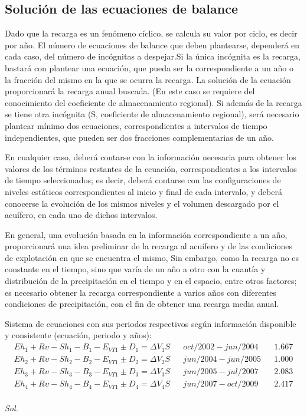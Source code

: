 \subsection{Solución de las ecuaciones de balance}
Dado que la recarga es un fenómeno cíclico, se calcula su valor por ciclo, es decir por año. El número de ecuaciones de balance que deben plantearse, dependerá en cada caso, del número de incógnitas a despejar.Si la única incógnita es la recarga, bastará con plantear una ecuación, que pueda ser la correspondiente a un año o la fracción del mismo en la que se ocurra la recarga. La solución de la ecuación proporcionará la recarga anual buscada. (En este caso se requiere del conocimiento del coeficiente de almacenamiento regional). 
Si además de la recarga se tiene otra incógnita (S, coeficiente de almacenamiento regional), será necesario plantear mínimo dos ecuaciones, correspondientes a intervalos de tiempo independientes, que pueden ser dos fracciones complementarias de un año.

En cualquier caso, deberá contarse con la información necesaria para obtener los valores de los términos restantes de la ecuación, correspondientes a los intervalos de tiempo seleccionados; es decir, deberá contarse con las configuraciones de niveles estáticos correspondientes al inicio y final de cada intervalo, y deberá conocerse la evolución de los mismos niveles y el volumen descargado por el acuífero, en cada uno de dichos intervalos.

En general, una evolución basada en la información correspondiente a un año, proporcionará una idea preliminar de la recarga al acuífero y de las condiciones de explotación en que se encuentra el mismo, Sin embargo, como la recarga no es constante en el tiempo, sino que varía de un año a otro con la cuantía y distribución de la precipitación en el tiempo y en el espacio, entre otros factores; es necesario obtener la recarga correspondiente a varios años con diferentes condiciones de precipitación, con el fin de obtener una recarga media anual.

\begin{example}
    Sistema de ecuaciones con sus periodos respectivos según información disponible y consistente (ecuación, periodo y años):
    \begin{align*}
        Eh_1 + R\upsilon - Sh_1 - B_1 - E_{VT1} \pm D_1 = \Delta V_1 S && oct / 2002 - jun / 2004&& 1.667\\
        Eh_2 + R\upsilon - Sh_2 - B_2 - E_{VT1} \pm D_2 = \Delta V_2 S && jun / 2004 - jun / 2005&& 1.000\\
        Eh_3 + R\upsilon - Sh_3 - B_3 - E_{VT1} \pm D_3 = \Delta V_3 S && jun / 2005 - jul / 2007&& 2.083\\
        Eh_4 + R\upsilon - Sh_4 - B_4 - E_{VT1} \pm D_4 = \Delta V_4 S && jun / 2007 - oct / 2009&& 2.417\\
    \end{align*}
\end{example}
\textit{ Sol. }

